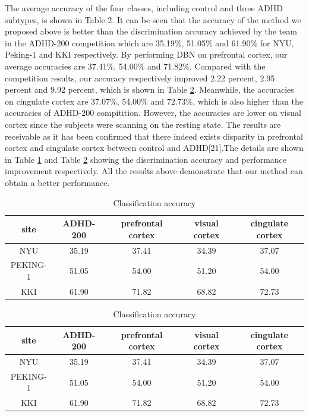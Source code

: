 \documentclass{llncs}
\begin{document}
The average accuracy of the four classes, including control and three ADHD subtypes, is shown in Table 2. It can be seen that the accuracy of the method we proposed above is better than the discrimination accuracy achieved by the team in the ADHD-200 competition which are 35.19\%, 51.05\% and 61.90\% for NYU, Peking-1 and KKI respectively. By performing DBN on prefrontal cortex, our average accuracies are 37.41\%, 54.00\% and 71.82\%. Compared with the competition results, our accuracy respectively improved 2.22 percent, 2.95 percent and 9.92 percent, which is shown in Table \ref{tab:4}. Meanwhile, the accuracies on cingulate cortex are 37.07\%, 54.00\% and 72.73\%, which is also higher than the accuracies of ADHD-200 compitition. However, the accuracies are lower on visual cortex since the subjects were scanning on the resting state. The results are receivable as it has been confirmed that there indeed exists disparity in prefrontal cortex and cingulate cortex between control and ADHD[21].The details are shown in Table  \ref{tab:3} and Table \ref{tab:4} showing the discrimination accuracy and performance improvement respectively. All the results above demonstrate that our method can obtain a better performance.



\begin{table}
\caption{Classification accuracy}
\label{tab:3}
\begin{center}
\begin{tabular}{ccccc}
\hline	\rule{0pt}{12pt}
site	&	ADHD-200 \qquad & prefrontal cortex \qquad&	visual cortex \qquad& cingulate cortex  \\[2pt]
\hline	\rule{0pt}{12pt}
NYU		&	35.19	&	37.41	&	34.39  & 37.07 \\
PEKING-1&	51.05	&	54.00	& 	51.20	&	54.00\\
KKI		&	61.90	&	71.82	&	68.82	& 72.73\\[2pt]
\hline
\end{tabular}
\end{center}
\end{table}


\begin{table}
\caption{Classification accuracy}
\label{tab:4}
\begin{center}
\begin{tabular}{ccccc}
\hline	\rule{0pt}{12pt}
site	&	ADHD-200 \qquad & prefrontal cortex \qquad&	visual cortex \qquad& cingulate cortex  \\[2pt]
\hline	\rule{0pt}{12pt}
NYU		&	35.19	&	37.41	&	34.39  & 37.07 \\
PEKING-1&	51.05	&	54.00	& 	51.20	&	54.00\\
KKI		&	61.90	&	71.82	&	68.82	& 72.73\\[2pt]
\hline
\end{tabular}
\end{center}
\end{table}
\end{document}
